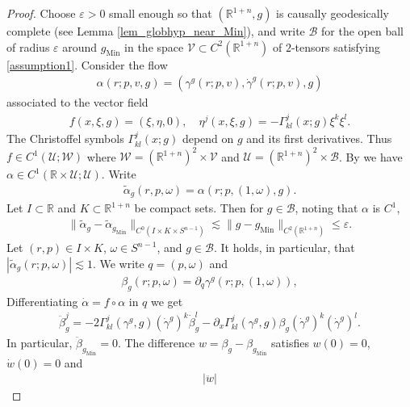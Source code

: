 \documentclass[11pt,letterpaper]{amsart}
\theoremstyle{definition}
\numberwithin{equation}{section}
\newcommand{\norm}[1]{\lVert #1 \rVert}         %
\newcommand{\eps}{\varepsilon}
\newcommand{\p}{\partial}
\newcommand{\gm}{g_{\mathrm{Min}}}
\def\p{\partial}
\def\R{\mathbb R}
\begin{document}
\begin{proof}
Choose $\eps > 0$ small enough so that $(\R^{1+n}, g)$ is causally geodesically complete (see Lemma \ref{lem_globhyp_near_Min}), and write $\mathcal B$ for the open ball of radius $\eps$ around $\gm$ in the space $\mathcal V \subset C^2(\R^{1+n})$ of $2$-tensors satisfying \eqref{assumption1}.
Consider the flow  
    \begin{align*}
\alpha(r; p, v, g) = (\gamma^g(r; p, v), \dot \gamma^g(r; p, v), g)
    \end{align*}
associated to the vector field
    \begin{align*}
f(x, \xi, g) = (\xi, \eta, 0), 
\quad \eta^j(x, \xi, g) = -\Gamma^j_{kl}(x; g) \xi^k \xi^l.
    \end{align*}
The Christoffel symbols $\Gamma^j_{kl}(x; g)$ depend on $g$ and its first derivatives. Thus $f \in C^1(\mathcal U; \mathcal W)$ 
where $\mathcal W = (\R^{1+n})^2 \times \mathcal V$ and  
$\mathcal U = (\R^{1+n})^2 \times \mathcal B$.
By \cite[Theorem 5.2]{lang1983} we have $\alpha \in C^1(\R \times \mathcal U; \mathcal U)$. 
Write
    \begin{align*}
\tilde \alpha_g(r,p,\omega) = \alpha(r; p,(1,\omega), g).
    \end{align*}
Let $I \subset \R$ and $K \subset \R^{1+n}$ be compact sets. Then for $g \in \mathcal B$, noting that $\alpha$ is $C^1$, 
    \begin{align*}
\norm{\tilde \alpha_g - \tilde \alpha_{\gm}}_{C^0(I \times K \times S^{n-1})}
\lesssim
\norm{g - \gm}_{C^2(\R^{1+n})} \le \eps.
    \end{align*}
Let $(r, p) \in I \times K$, $\omega \in S^{n-1}$, and $g \in \mathcal B$. It holds, in particular, that $|\tilde \alpha_g(r; p, \omega)| \lesssim 1$.
We write $q = (p, \omega)$ and 
    \begin{align*}
\beta_g(r; p, \omega) = \p_q \gamma^g(r; p, (1, \omega)),
    \end{align*}
Differentiating $\dot \alpha = f \circ \alpha$ in $q$ we get
    \begin{align*}
\ddot \beta_g^j = -2 \Gamma^j_{kl}(\gamma^g, g) (\dot \gamma^g)^k \dot \beta_g^l -\p_x \Gamma^j_{kl}(\gamma^g, g) \beta_g (\dot \gamma^g)^k (\dot \gamma^g)^l.
    \end{align*} 
In particular, $\ddot \beta_{\gm} = 0$. The difference $w = \beta_g - \beta_{\gm}$ satisfies $w(0) = 0$, $\dot w(0) = 0$ and 
    \begin{align*}
|\ddot w| 

\end{align*}
\end{proof}
\end{document}
